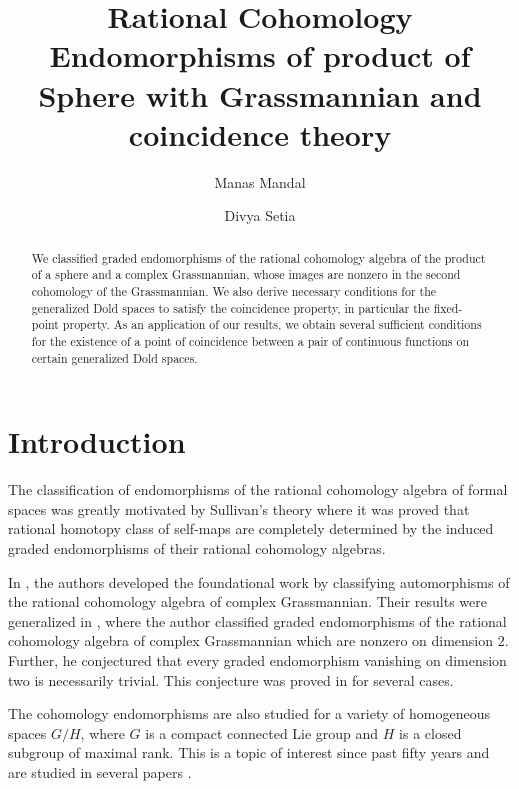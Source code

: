 \documentclass{amsart}
\title[Graded Endomorphisms of $H^*(\mathbb{S}^m \times \mathbb{C}G_{n,k};\mathbb Q)$]{Rational Cohomology Endomorphisms of product of Sphere with Grassmannian and coincidence theory}
\author[M. Mandal]{Manas Mandal}
\author[D. Setia]{Divya Setia}
\begin{document}
	\begin{abstract}
		We classified graded endomorphisms of the rational cohomology algebra of the product of a sphere and a complex Grassmannian, whose images are nonzero  in the second cohomology of the Grassmannian.
		We also derive necessary conditions for the generalized Dold spaces to satisfy the coincidence property, in particular the fixed-point property. As an application of our results, we obtain several sufficient conditions for the existence of a point of coincidence between a pair of continuous functions on certain generalized Dold spaces. 
	\end{abstract}
	
	\maketitle
	
	\section{Introduction} \label{intro}
	The classification of endomorphisms of the rational cohomology algebra of formal spaces was greatly motivated by Sullivan's theory where it was  proved that rational homotopy class of self-maps are completely determined by the induced graded endomorphisms of their rational cohomology algebras. 
	
	In \cite{brewster}, the authors developed the foundational work by classifying automorphisms of the rational cohomology algebra of complex Grassmannian. Their results were generalized in \cite{hoffman}, where the author classified graded endomorphisms of the rational cohomology algebra of complex Grassmannian which are nonzero on dimension $2$. Further, he conjectured that every graded endomorphism  vanishing on dimension two is necessarily trivial. This conjecture was proved in \cite{glover-homer} for several cases.
	
	The cohomology endomorphisms are also studied for a variety of homogeneous spaces $G/H$, where $G$ is a compact connected Lie group and $H$ is a closed
	subgroup of maximal rank. This is a topic of interest since past fifty years and are studied in several papers \cite{shiga-tezuka2, brewster-homer, hoffman-homer, Papadima, duan, duan-fang, duan-zhao, lin, goswami-sarkar}. 
	
\end{document}
